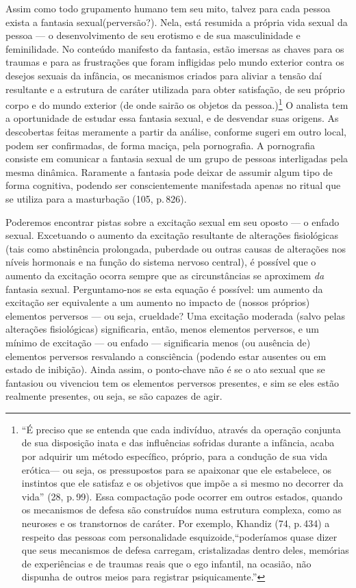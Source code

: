 Assim como todo grupamento humano tem seu mito, talvez para cada
pessoa exista a fantasia sexual\idxfanta[|(] (perversão?). Nela, está resumida a
própria vida sexual da pessoa --- o desenvolvimento de seu erotismo e
de sua masculinidade e feminilidade. No conteúdo manifesto da fantasia,
estão imersas as chaves para os traumas e para as frustrações que foram
infligidas pelo mundo exterior contra os desejos sexuais da infância,
os mecanismos criados para aliviar a tensão daí resultante e a
estrutura de caráter utilizada para obter satisfação, de seu próprio
corpo e do mundo exterior (de onde sairão os objetos da pessoa.)\footnote{ ``É preciso que se
entenda que cada indivíduo,
através da operação conjunta de sua disposição inata e das influências
sofridas durante a infância, acaba por adquirir um método específico,
próprio, para a condução de sua vida erótica\idxfreuddesen[|nn] --- ou seja, os
pressupostos para se apaixonar que ele estabelece, os instintos que ele
satisfaz e os objetivos que impõe a si mesmo no decorrer da
vida'' (28, p.\,99). Essa compactação pode ocorrer em
outros estados, quando os mecanismos de defesa são construídos numa
estrutura complexa, como as neuroses e os transtornos de caráter. Por
exemplo, Khan\idxkhan[|nn] diz (74, p.\,434) a respeito das pessoas com personalidade
esquizoide,\idxesquiz[|nn] ``poderíamos quase dizer que seus mecanismos
de defesa carregam, cristalizadas dentro deles, memórias de experiências
e de traumas reais\idxfantareal{} que o ego infantil, na ocasião, não dispunha de
outros meios para registrar psiquicamente.''} O analista
tem a oportunidade de estudar essa fantasia sexual, e de desvendar suas
origens. As descobertas feitas meramente a partir da análise, conforme
sugeri em outro local, podem ser confirmadas, de forma maciça, pela
pornografia.\idxpornofant{} A pornografia consiste em comunicar a fantasia sexual de
um grupo de pessoas interligadas pela mesma dinâmica. Raramente a
fantasia pode deixar de assumir algum tipo de forma cognitiva, podendo
ser conscientemente manifestada apenas no ritual que se utiliza para a
masturbação (105, p.\,826).

Poderemos encontrar pistas sobre a excitação sexual em seu oposto
--- o enfado sexual. Excetuando o aumento da excitação resultante de
alterações fisiológicas (tais como abstinência prolongada, puberdade ou
outras causas de alterações nos níveis hormonais e na função do sistema
nervoso central), é possível que o aumento da excitação ocorra sempre
que as circunstâncias se aproximem \textit{da} fantasia sexual.
Perguntamo-nos se esta equação é possível: um aumento da excitação ser
equivalente a um aumento no impacto de (nossos próprios) elementos
perversos --- ou seja, crueldade? Uma excitação moderada (salvo pelas
alterações fisiológicas) significaria, então, menos elementos
perversos, e um mínimo de excitação --- ou enfado\idxenfafamil{} --- significaria
menos (ou ausência de) elementos perversos resvalando a consciência
(podendo estar ausentes ou em estado de inibição). Ainda assim, o
ponto-chave não é se o ato sexual que se fantasiou ou vivenciou tem os
elementos perversos presentes, e sim se eles estão realmente presentes,
ou seja, se são capazes de agir.

